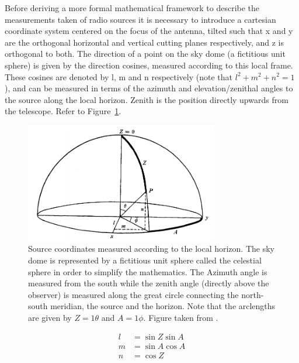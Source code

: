 Before deriving a more formal mathematical framework to describe the measurements taken of radio sources it is necessary to introduce a 
cartesian coordinate system centered on the focus of the antenna, tilted such that x and y are the orthogonal horizontal and vertical cutting planes respectively, and z
is orthogonal to both. The direction of a point on the sky dome (a fictitious unit sphere) is given by the direction cosines, measured according to this local frame. These cosines are 
denoted by l, m and n respectively (note that $l^2 + m^2 + n^2 = 1$), and can be measured in terms of the azimuth and elevation/zenithal angles to the source along the local horizon.
Zenith is the position directly upwards from the telescope. Refer to Figure~\ref{fig_lmn}.
\begin{figure}[ht]
\begin{mdframed}
 \centering
 \includegraphics[width=0.75\textwidth]{images/lmn.png}
 \caption[lmn coordinates]{Source coordinates measured according to the local horizon. The sky dome is represented by a fictitious unit sphere called the celestial sphere in order to simplify 
 the mathematics. The Azimuth angle is measured from the south while the zenith angle (directly above the observer) is measured along the great circle connecting the north-south meridian, the source 
 and the horizon. Note that the arclengths are given by $Z=1\theta$ and $A=1\phi$. Figure taken from \cite{christiansenradiotelescopes}.}
 \label{fig_lmn}
\end{mdframed}
\end{figure}
\begin{equation*}
 \begin{split}
  l &= \sin{Z}\sin{A}\\
  m &= \sin{A}\cos{A}\\
  n &= \cos{Z}\\
 \end{split}
\end{equation*}

